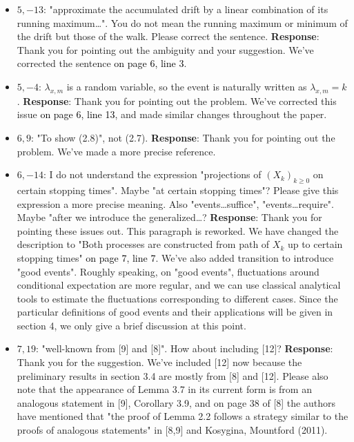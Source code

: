 \documentclass[11pt,a4paper]{article}
\numberwithin{equation}{section}
\newcommand{\PL}[2]{\textcolor{black}{on page {#1}, line {#2}}}
\begin{document}
\begin{itemize}
		
		\item 
		$5,-13$: "approximate the accumulated drift by a linear combination of its running maximum\dots". You do not mean the running maximum or minimum of the drift but those of the walk. Please correct the sentence.
		\subitem \textbf{Response}:
		Thank you for pointing out the ambiguity and your suggestion. We've corrected the sentence \PL{6}{3}.
		
		
		\item 
		$5,-4$: $\lambda_{x,m}$ is a random variable, so the event is naturally written as $\lambda_{x,m} = k$.
		\subitem \textbf{Response}:
		Thank you for pointing out the problem. We've corrected this issue \PL{6}{13}, and made similar changes throughout the paper.
		
		\item 
		$6,9$: "To show (2.8)", not (2.7).
		\subitem \textbf{Response}:
		Thank you for pointing out the problem. We've made a more precise reference.
		
		\item 
		$6,-14$: I do not understand the expression "projections of $(X_k)_{k\geq 0}$ on certain stopping times". Maybe "at certain stopping times"? Please give this expression a more precise meaning. Also "events\dots suffice", "events\dots require". Maybe "after we introduce the generalized\dots?
		\subitem \textbf{Response}:
		Thank you for pointing these issues out. This paragraph is reworked. We have changed the description to "Both processes are constructed from path of $X_k$ up to certain stopping times" \PL{7}{7}. We've also added transition to introduce "good events". Roughly speaking, on "good events", fluctuations around conditional expectation are more regular, and we can use classical analytical tools to estimate the fluctuations corresponding to different cases. Since the particular definitions of good events and their applications will be given in section 4, we only give a brief discussion at this point.
		
		\item 
		$7,19$: "well-known from [9] and [8]". How about including [12]?
		\subitem \textbf{Response}: Thank you for the suggestion. We've included [12] now because the preliminary results in section 3.4 are mostly from [8] and [12].
		Please also note that the appearance of Lemma 3.7 in its current form is from an analogous statement in [9], Corollary 3.9, and on page 38 of [8] the authors have mentioned that "the proof of Lemma 2.2 follows a strategy similar to the proofs of analogous statements" in [8,9] and Kosygina, Mountford (2011).
		

\end{itemize}
\end{document}

